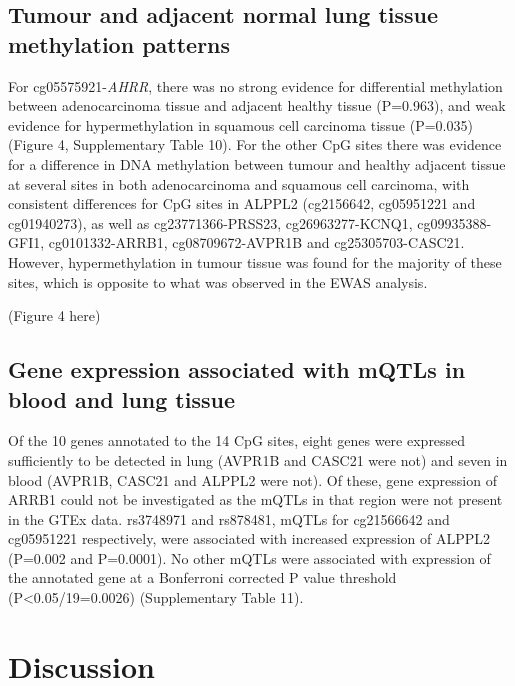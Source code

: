 \documentclass[11pt,oneside]{bristolthesis}
\begin{document}
\hypertarget{tumour-and-adjacent-normal-lung-tissue-methylation-patterns}{%
\subsection{Tumour and adjacent normal lung tissue methylation patterns}\label{tumour-and-adjacent-normal-lung-tissue-methylation-patterns}}

For cg05575921-\emph{AHRR}, there was no strong evidence for differential methylation between adenocarcinoma tissue and adjacent healthy tissue (P=0.963), and weak evidence for hypermethylation in squamous cell carcinoma tissue (P=0.035) (Figure 4, Supplementary Table 10). For the other CpG sites there was evidence for a difference in DNA methylation between tumour and healthy adjacent tissue at several sites in both adenocarcinoma and squamous cell carcinoma, with consistent differences for CpG sites in ALPPL2 (cg2156642, cg05951221 and cg01940273), as well as cg23771366-PRSS23, cg26963277-KCNQ1, cg09935388-GFI1, cg0101332-ARRB1, cg08709672-AVPR1B and cg25305703-CASC21. However, hypermethylation in tumour tissue was found for the majority of these sites, which is opposite to what was observed in the EWAS analysis.

(Figure 4 here)

\hypertarget{gene-expression-associated-with-mqtls-in-blood-and-lung-tissue}{%
\subsection{Gene expression associated with mQTLs in blood and lung tissue}\label{gene-expression-associated-with-mqtls-in-blood-and-lung-tissue}}

Of the 10 genes annotated to the 14 CpG sites, eight genes were expressed sufficiently to be detected in lung (AVPR1B and CASC21 were not) and seven in blood (AVPR1B, CASC21 and ALPPL2 were not). Of these, gene expression of ARRB1 could not be investigated as the mQTLs in that region were not present in the GTEx data. rs3748971 and rs878481, mQTLs for cg21566642 and cg05951221 respectively, were associated with increased expression of ALPPL2 (P=0.002 and P=0.0001). No other mQTLs were associated with expression of the annotated gene at a Bonferroni corrected P value threshold (P\textless0.05/19=0.0026) (Supplementary Table 11).

\hypertarget{discussion-07}{%
\section{Discussion}\label{discussion-07}}
\end{document}
